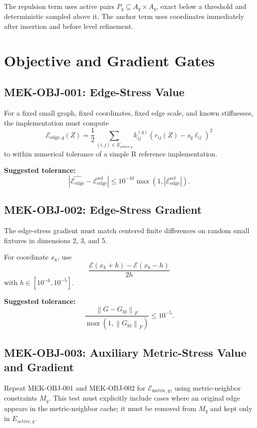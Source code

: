 \documentclass[11pt]{article}
\newcommand{\norm}[1]{\left\lVert #1 \right\rVert}
\newcommand{\Eedge}{\mathcal{E}_{\mathrm{edge}}}
\begin{document}
The repulsion term uses active pairs \(P_q\subseteq A_q\times A_q\), exact below
a threshold and deterministic sampled above it. The anchor term uses coordinates
immediately after insertion and before level refinement.

\section{Objective and Gradient Gates}

\subsection{MEK-OBJ-001: Edge-Stress Value}

For a fixed small graph, fixed coordinates, fixed edge scale, and known
stiffnesses, the implementation must compute
\[
  \mathcal{E}_{\mathrm{edge},q}(Z)
  =
  \frac{1}{2}
  \sum_{(i,j)\in E_{\mathrm{active},q}}
  k_{ij}^{(q)}
  \left(r_{ij}(Z)-s_q\ell_{ij}\right)^2
\]
to within numerical tolerance of a simple R reference implementation.

\textbf{Suggested tolerance:}
\[
  |\widehat{\Eedge}-\Eedge^{\mathrm{ref}}|
  \le 10^{-10}\max(1,|\Eedge^{\mathrm{ref}}|).
\]

\subsection{MEK-OBJ-002: Edge-Stress Gradient}

The edge-stress gradient must match centered finite differences on random
small fixtures in dimensions 2, 3, and 5.

For coordinate \(x_k\), use
\[
  \frac{\mathcal{E}(x_k+h)-\mathcal{E}(x_k-h)}{2h}
\]
with \(h\in[10^{-6},10^{-5}]\).

\textbf{Suggested tolerance:}
\[
  \frac{\norm{G-G_{\mathrm{fd}}}_F}{\max(1,\norm{G_{\mathrm{fd}}}_F)}
  \le 10^{-5}.
\]

\subsection{MEK-OBJ-003: Auxiliary Metric-Stress Value and Gradient}

Repeat MEK-OBJ-001 and MEK-OBJ-002 for
\(\mathcal{E}_{\mathrm{metric},q}\), using metric-neighbor
constraints \(M_q\). This test must explicitly include cases where an original
edge appears in the metric-neighbor cache; it must be removed from \(M_q\) and
kept only in \(E_{\mathrm{active},q}\).
\end{document}

